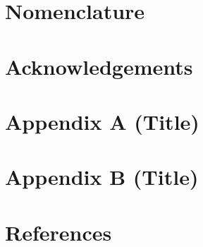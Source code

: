 \documentclass[]{IAC_style_updated}
\begin{document}
\section*{Nomenclature}
    

\section*{Acknowledgements}

\section*{Appendix A (Title)}

\section*{Appendix B (Title)}

\section*{References}
\end{document}
